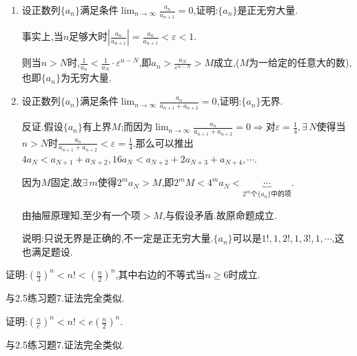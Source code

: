      \begin{exercise}
         \begin{enumerate}
             \item 设正数列$\{a_n\}$满足条件$\lim_{n\to\infty}\frac{a_n}{a_{n+1}}=0$,证明:$\{a_n\}$是正无穷大量.
                   \begin{solution}
                       事实上,当$n$足够大时$\left|\frac{a_n}{a_{n+1}}\right|=\frac{a_n}{a_{n+1}}<\varepsilon<1$.

                       则当$n>N$时,$\frac{1}{a_n}<\frac{1}{a_N}\cdot\varepsilon^{n-N}$,即$a_n>\frac{a_N}{\varepsilon^{n-N}}>M$成立,($M$为一给定的任意大的数),也即$\{a_n\}$为无穷大量.
                   \end{solution}

             \item 设正数列$\{a_n\}$满足条件$\lim_{n\to\infty}\frac{a_n}{a_{n+1}+a_{n+2}}=0$,证明:$\{a_n\}$无界.
                   \begin{solution}
                       反证.假设$\{a_n\}$有上界$M$;而因为$\lim_{n\to\infty}\frac{a_n}{a_{n+1}+a_{n+2}}=0$$\Rightarrow $对$\varepsilon=\frac{1}{4},\exists\, N$使得当$n>N$时$\frac{a_n}{a_{n+1}+a_{n+2}}<\varepsilon=\frac{1}{4}$.那么可以推出$4a_N<a_{N+1}+a_{N+2},16a_N<a_{N+2}+2a_{N+3}+a_{N+4},\cdots$.

                       因为$M$固定,故$\exists\, m$使得$2^ma_N>M$,即$2^mM<4^ma_N<\underbrace{\cdots}_{2^m\text{个}\{a_n\}\text{中的项}} $.

                       由抽屉原理知,至少有一个项$>M$,与假设矛盾.故原命题成立.

                       说明:只说无界是正确的,不一定是正无穷大量.$\{a_n\}$可以是$1!,1,2!,1,3!,1,\cdots$,这也满足题设.
                   \end{solution}
         \end{enumerate}
     \end{exercise}

     \begin{exercise}
         证明:$\left(\frac{n}{3}\right)^n<n!<\left(\frac{n}{2}\right)^n$,其中右边的不等式当$n\geqslant 6$时成立.
     \end{exercise}
     \begin{solution}
         与2.5练习题7.证法完全类似.
     \end{solution}

     \begin{exercise}
         证明:$\left(\frac{n}{e}\right)^n<n!<e\left(\frac{n}{2}\right)^n$.
     \end{exercise}
     \begin{solution}
         与2.5练习题7.证法完全类似.
     \end{solution}

